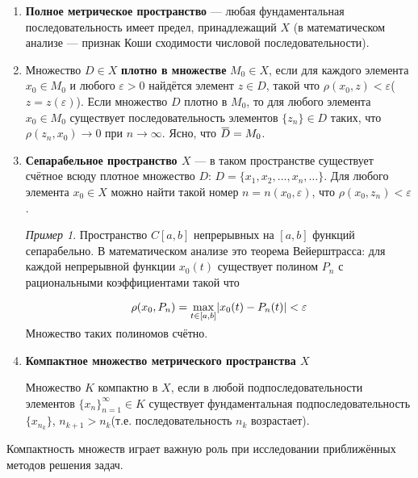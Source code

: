 \documentclass[12pt,a4paper,titlepage, oneside]{book}
\newcommand{\overbar}[1]{\mkern 1.5mu\overline{\mkern-1.5mu#1\mkern-1.5mu}\mkern 1.5mu}
\theoremstyle{definition}
\theoremstyle{plain}
\theoremstyle{remark}
\theoremstyle{remark}
\newtheorem*{example}{Пример}
\theoremstyle{remark}
\theoremstyle{plain}
\theoremstyle{plain}
\begin{document}
\begin{enumerate}

	\item \textbf{Полное метрическое пространство} --- любая фундаментальная последовательность имеет предел, принадлежащий $X$ (в математическом анализе --- признак Коши сходимости числовой последовательности).

	\item Множество $D \in X$ \textbf{плотно в множестве} $ M_0 \in X$, если для каждого элемента $x_0 \in M_0$ и любого $\varepsilon > 0$ найдётся элемент $z \in D$, такой что $\rho(x_0, z) < \varepsilon$($z = z(\varepsilon)$). Если множество $D$ плотно в $M_0$, то для любого элемента $x_0 \in  M_0$ существует последовательность элементов $\lbrace z_n \rbrace \in D$ таких, что $\rho(z_n, x_0) \to 0$ при $n \to \infty$. Ясно, что $\overbar{D} = M_0$.

	\item \textbf{Сепарабельное пространство $X$} --- в таком пространстве существует счётное всюду плотное множество $D$: $D=\lbrace x_1,x_2,\ldots,x_n,\ldots \rbrace$. Для любого элемента $x_0 \in X$ можно найти такой номер $n = n(x_0,\varepsilon)$, что $\rho(x_0, z_n) < \varepsilon$.

	\begin{example}	
	Пространство $C[a,b]$ непрерывных на $[a,b]$ функций сепарабельно. В математическом анализе это теорема Вейерштрасса: для каждой непрерывной функции $x_0(t)$ существует полином $P_n$ с рациональными коэффициентами такой что
	
	\begin{equation*}
	\rho(x_0, P_n)=\smash{\displaystyle\max_{t \in [a,b]}} |x_0(t)-P_n(t)| < \varepsilon
	\end{equation*}

	Множество таких полиномов счётно.
	\end{example}

	\item \textbf{Компактное множество метрического пространства $X$}

	Множество $K$ компактно в $X$, если в любой подпоследовательности элементов $\lbrace x_n \rbrace_{n=1}^{\infty} \in K$ существует фундаментальная подпоследовательность $\lbrace x_{n_k} \rbrace$, $n_{k+1}>n_k$(т.е. последовательность $n_k$ возрастает).

\end{enumerate}


Компактность множеств играет важную роль при исследовании приближённых методов решения задач.
\end{document}
